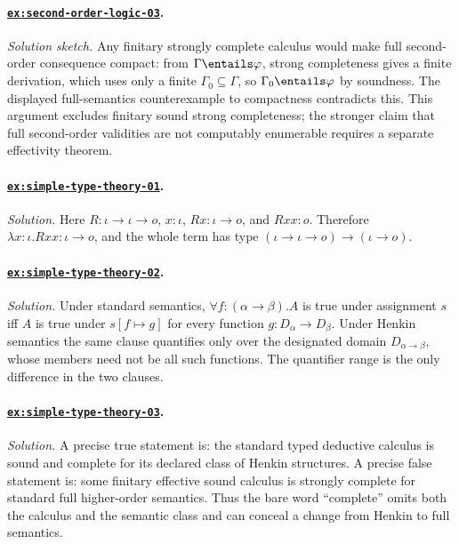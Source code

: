 \paragraph{\hyperref[ex:second-order-logic-03]{\texttt{ex:second-order-logic-03}}.}
\textit{Solution sketch.}  Any finitary strongly complete calculus would make
full second-order consequence compact: from \(\Gamma\entails\varphi\), strong
completeness gives a finite derivation, which uses only a finite
\(\Gamma_0\subseteq\Gamma\), so \(\Gamma_0\entails\varphi\) by soundness.  The
displayed full-semantics counterexample to compactness contradicts this.  This
argument excludes finitary sound strong completeness; the stronger claim that
full second-order validities are not computably enumerable requires a separate
effectivity theorem.

\paragraph{\hyperref[ex:simple-type-theory-01]{\texttt{ex:simple-type-theory-01}}.}
\textit{Solution.}  Here
\(R:\iota\to\iota\to o\), \(x:\iota\),
\(Rx:\iota\to o\), and \(Rxx:o\).  Therefore
\(\lambda x{:}\iota.Rxx:\iota\to o\), and the whole term has type
\((\iota\to\iota\to o)\to(\iota\to o)\).

\paragraph{\hyperref[ex:simple-type-theory-02]{\texttt{ex:simple-type-theory-02}}.}
\textit{Solution.}  Under standard semantics,
\(\forall f{:}(\alpha\to\beta).A\) is true under assignment \(s\) iff
\(A\) is true under \(s[f\mapsto g]\) for every function
\(g:D_\alpha\to D_\beta\).  Under Henkin semantics the same clause quantifies
only over the designated domain \(D_{\alpha\to\beta}\), whose members need not
be all such functions.  The quantifier range is the only difference in the two
clauses.

\paragraph{\hyperref[ex:simple-type-theory-03]{\texttt{ex:simple-type-theory-03}}.}
\textit{Solution.}  A precise true statement is: the standard typed deductive
calculus is sound and complete for its declared class of Henkin structures.  A
precise false statement is: some finitary effective sound calculus is strongly
complete for standard full higher-order semantics.  Thus the bare word
``complete'' omits both the calculus and the semantic class and can conceal a
change from Henkin to full semantics.

